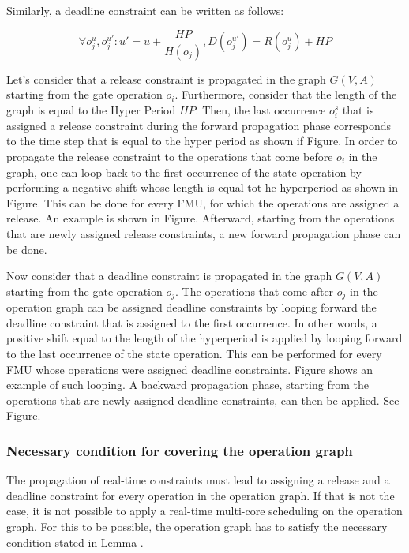 Similarly, a deadline constraint can be written as follows:

\begin{equation}
\forall o_j^u, o_j^{u'}: u' = u + \frac{HP}{H(o_j)}, D(o_j^{u'}) = R(o_j^u) + HP
\label{eq:release}
\end{equation}

Let's consider that a release constraint is propagated in the graph $G(V,A)$ starting from the gate operation $o_i$.  Furthermore, consider that the length of the graph is equal to the Hyper Period $HP$. Then, the last occurrence $o_i^s$ that is assigned a release constraint during the forward propagation phase corresponds to the time step that is equal to the hyper period as shown if Figure. In order to propagate the release constraint to the operations that come before $o_i$ in the graph, one can loop back to the first occurrence of the state operation by performing a negative shift whose length is equal tot he hyperperiod as shown in Figure. This can be done for every FMU, for which the operations are assigned a release. An example is shown in Figure. Afterward, starting from the operations that are newly assigned release constraints, a new forward propagation phase can be done.  

Now consider that a deadline constraint is propagated in the graph $G(V,A)$ starting from the gate operation $o_j$. The operations that come after $o_j$ in the operation graph can be assigned deadline constraints by looping forward the deadline constraint that is assigned to the first occurrence. In other words, a positive shift equal to the length of the hyperperiod is applied by looping forward to the last occurrence of the state operation. This can be performed for every FMU whose operations were assigned deadline constraints. Figure shows an example of such looping. A backward propagation phase, starting from the operations that are newly assigned deadline constraints, can then be applied. See Figure. 

\subsubsection{Necessary condition for covering the operation graph}

The propagation of real-time constraints must lead to assigning a release and a deadline constraint for every operation in the operation graph. If that is not the case, it is not possible to apply a real-time multi-core scheduling on the operation graph. For this to be possible, the operation graph has to satisfy the necessary condition stated in Lemma \re{}.

